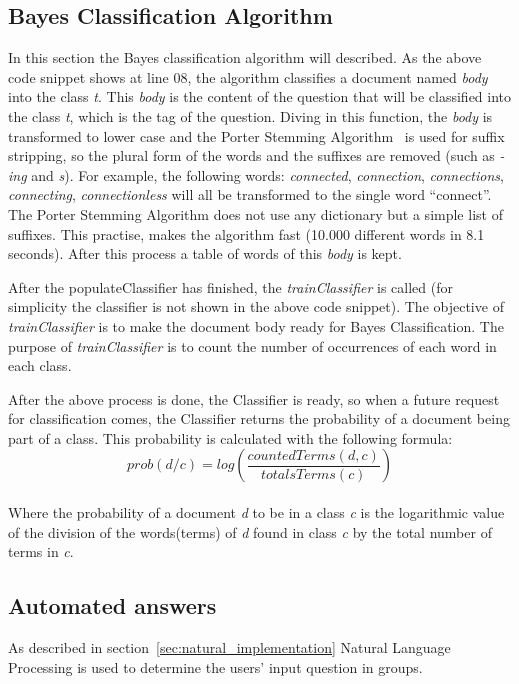 \subsection{Bayes Classification Algorithm}
In this section the Bayes classification algorithm will described. As the above code snippet shows at line 08, the algorithm classifies a document named \emph{body} into the class \emph{t}. This \emph{body} is the content of the question that will be classified into the class \emph{t}, which is the tag of the question. Diving in this function, the \emph{body} is transformed to lower case and the Porter Stemming Algorithm~\citep{porter1980algorithm} is used for suffix stripping, so the plural form of the words and the suffixes are removed (such as \emph{-ing} and \emph{s}). For example, the following words: {\it connected}, {\it connection}, {\it connections}, {\it connecting}, {\it connectionless} will all be transformed to the single word ``connect''. The Porter Stemming Algorithm does not use any dictionary but a simple list of suffixes. This practise, makes the algorithm fast (10.000 different words in 8.1 seconds). After this process a table of words of this \emph{body} is kept.

After the populateClassifier has finished, the \emph{trainClassifier} is called (for simplicity the classifier is not shown in the above code snippet). The objective of \emph{trainClassifier} is to make the document body ready for Bayes Classification. The purpose of \emph{trainClassifier} is to count the number of occurrences of each word in each class.

After the above process is done, the Classifier is ready, so when a future request for classification comes, the Classifier returns the probability of a document being part of a class. This probability is calculated with the following formula:
\\
\[prob(d / c) = log\left ( \frac{countedTerms(d, c)}{totalsTerms(c)} \right )\]
\\
Where the probability of a document {\it d} to be in a class {\it c} is the logarithmic value of the division of the words(terms) of {\it d} found in class {\it c} by the total number of terms in {\it c}.

\subsection{Automated answers}
\label{sec:example_nlp}
As described in section~\ref{sec:natural_implementation} Natural Language Processing is used to determine the users' input question in groups. 

